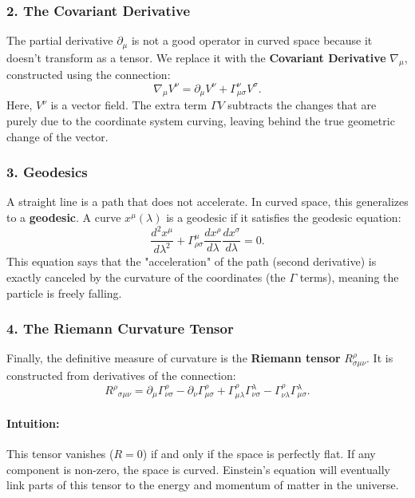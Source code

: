 \documentclass[11pt, a4paper]{report}
\begin{document}
\subsubsection*{2. The Covariant Derivative}
The partial derivative \(\partial_\mu\) is not a good operator in curved space because it doesn't transform as a tensor. We replace it with the \textbf{Covariant Derivative} \(\nabla_\mu\), constructed using the connection:
\begin{equation}
\label{eq:cov_deriv_preview}
\nabla_{\mu}V^{\nu} = \partial_{\mu}V^{\nu} + \Gamma_{\mu\sigma}^{\nu}V^{\sigma}.
\end{equation}
Here, \(V^\nu\) is a vector field. The extra term \(\Gamma V\) subtracts the changes that are purely due to the coordinate system curving, leaving behind the true geometric change of the vector.

\subsubsection*{3. Geodesics}
A straight line is a path that does not accelerate. In curved space, this generalizes to a \textbf{geodesic}. A curve \(x^\mu(\lambda)\) is a geodesic if it satisfies the geodesic equation:
\begin{equation}
\label{eq:geodesic_preview}
\frac{d^{2}x^{\mu}}{d\lambda^{2}} + \Gamma_{\rho\sigma}^{\mu} \frac{dx^{\rho}}{d\lambda} \frac{dx^{\sigma}}{d\lambda} = 0.
\end{equation}
This equation says that the "acceleration" of the path (second derivative) is exactly canceled by the curvature of the coordinates (the \(\Gamma\) terms), meaning the particle is freely falling.

\subsubsection*{4. The Riemann Curvature Tensor}
Finally, the definitive measure of curvature is the \textbf{Riemann tensor} \(R^\rho_{\sigma\mu\nu}\). It is constructed from derivatives of the connection:
\begin{equation}
\label{eq:riemann_preview}
{R^{\rho}}_{\sigma\mu\nu} = \partial_{\mu}\Gamma_{\nu\sigma}^{\rho} - \partial_{\nu}\Gamma_{\mu\sigma}^{\rho} + \Gamma_{\mu\lambda}^{\rho}\Gamma_{\nu\sigma}^{\lambda} - \Gamma_{\nu\lambda}^{\rho}\Gamma_{\mu\sigma}^{\lambda}.
\end{equation}

\paragraph{Intuition:} This tensor vanishes (\(R=0\)) if and only if the space is perfectly flat. If any component is non-zero, the space is curved. Einstein's equation will eventually link parts of this tensor to the energy and momentum of matter in the universe.
\end{document}
